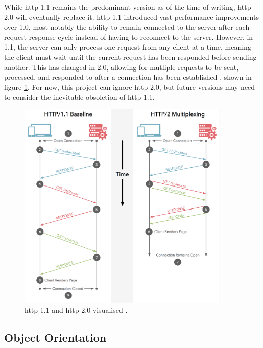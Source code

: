 \documentclass[11pt]{article}
\begin{document}
While \acrshort{http} 1.1 remains the predominant version as of the time of writing, \acrshort{http} 2.0 will eventually replace it. \acrshort{http} 1.1 introduced vast performance improvements over 1.0, most notably the ability to remain connected to the \gls{server} after each \gls{request}-\gls{response} cycle instead of having to reconnect to the \gls{server}. However, in 1.1, the \gls{server} can only process one \gls{request} from any \gls{client} at a time, meaning the \gls{client} must wait until the current \gls{request} has been responded before sending another. This has changed in 2.0, allowing for mutliple \gls{request}s to be sent, processed, and responded to after a connection has been established \cite{http2}, shown in figure \ref{fig:http-visualised}. For now, this project can ignore \acrshort{http} 2.0, but future versions may need to consider the inevitable obsoletion of \acrshort{http} 1.1.

\begin{figure}[h!]
    \centering
    \includegraphics[width=0.9\textwidth]{figures/http1-vs-http2-multiplexing.png}
    \caption{\acrshort{http} 1.1 and \acrshort{http} 2.0 visualised \cite{http1-vs-http2}.}
    \label{fig:http-visualised}
\end{figure}

\subsection{Object Orientation}
\end{document}
